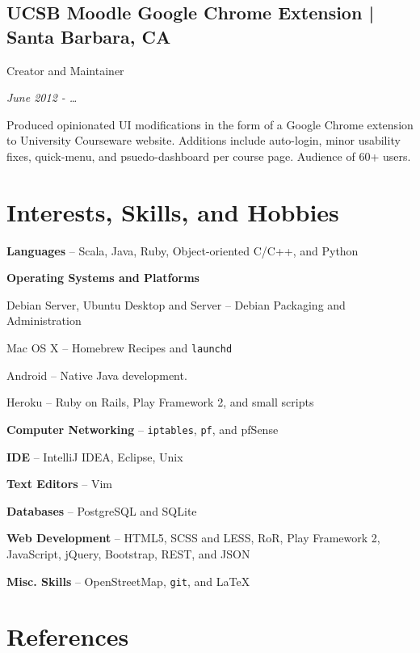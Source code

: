 \documentclass[10pt, letter]{article}
\newcommand{\years}[1]{\marginnote{#1}}
\renewcommand{\years}[1]{{\emph{#1}}}
\newenvironment{packed_item}{
\begin{itemize}
  \setlength{\itemsep}{1pt}
  \setlength{\parskip}{0pt}
  \setlength{\parsep}{0pt}
}{\end{itemize}}
\begin{document}
\begin{multicols}{2}
\subsection*{UCSB Moodle Google Chrome Extension | {\footnotesize{Santa Barbara, CA}}}

Creator and Maintainer

\years{June 2012 - \ldots}

Produced opinionated UI modifications in the form of a Google Chrome extension
to University Courseware website. Additions include auto-login, minor usability
fixes, quick-menu, and psuedo-dashboard per course page. Audience of 60+ users.

\section*{Interests, Skills, and Hobbies}

\begin{packed_item}
\item \textbf{Languages} -- Scala, Java, Ruby, Object-oriented C/C++, and Python
\item \textbf{Operating Systems and Platforms}
        \begin{packed_item}
            \item Debian Server, Ubuntu Desktop and Server -- Debian Packaging and Administration
            \item Mac OS X -- Homebrew Recipes and \texttt{launchd}
            \item Android -- Native Java development.
            \item Heroku -- Ruby on Rails, Play Framework 2, and small scripts
        \end{packed_item}
    \item \textbf{Computer Networking} -- \texttt{iptables}, \texttt{pf}, and pfSense
    \item \textbf{IDE} -- IntelliJ IDEA, Eclipse, Unix
    \item \textbf{Text Editors} -- Vim
    \item \textbf{Databases} -- PostgreSQL and SQLite
    \item \textbf{Web Development} -- HTML5, SCSS and LESS, RoR, Play Framework 2, JavaScript, jQuery, Bootstrap, REST, and JSON
    \item \textbf{Misc. Skills} -- OpenStreetMap, \texttt{git}, and \LaTeX
\end{packed_item}

\section*{References}


\end{multicols}
\end{document}
